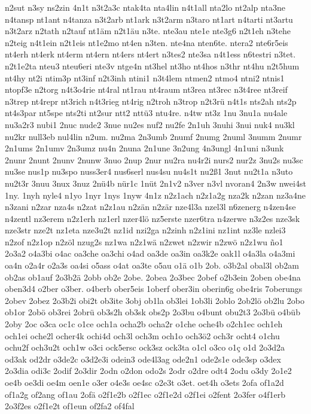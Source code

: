 {n2sut
n3sy
ns2zin
4n1t
n3t2a3c
ntak4ta
nta4lin
n4t1all
nta2lo
nt2alp
nta3ne
n4tansp
nt1ant
n4tanza
n3t2arb
nt1ark
n3t2arm
n3taro
nt1art
n4tarti
nt3artu
n3t2arz
n2tath
n2tauf
nt1äm
n2t1äu
n3te.
nte3au
nte1e
nte3g6
n2t1eh
n3tehe
n2teig
n4t1ein
n2t1eis
nt1e2mo
nt4en
n3ten.
nte4na
nten6te.
ntera2
nte6r5eis
nt4erh
nt4erk
nt4erm
nt4ern
nt4ers
nt4ert
n3tes2
nte3sa
n4t1ess
n6testri
n3tet.
n2t1e2ta
nteu3
nteu6eri
nte3v
ntge4n
nt3hel
nt3ho
nt4hos
n3thr
nt4hu
n2t5hum
nt4hy
nt2i
ntim3p
nt3inf
n2t3inh
ntini1
n3t4lem
ntmen2
ntmo4
ntni2
ntnis1
ntopf3e
n2torg
n4t3o4rie
nt4ral
nt1rau
nt4raum
nt3rea
nt3rec
n3t4ree
nt3reif
n3trep
nt4repr
nt3rich
n4t3rieg
nt4rig
n2troh
n3trop
n2t3rü
n4t1s
nts2ah
nts2p
nt4s3par
nt5spe
nts2ti
nt2sur
ntt2
nttü3
ntu4re.
n4tw
nt3z
1nu
3nu1a
nu4ale
nu3a2r3
nubi1
2nuc
nude2
3nue
nu2es
nuf2
nu2fe
2n1uh
3nuhi
3nui
nuk4
nu3kl
nu2kr
null3eb
nul4lin
n2um.
nu2ma
2n3umb
2numf
2numg
2numl
3numm
2numr
2n1ums
2n1umv
2n3umz
nu4n
2nuna
2n1une
3n2ung
4n3ungl
4n1uni
n3unk
2nunr
2nunt
2nunv
2nunw
3nuo
2nup
2nur
nu2ra
nu4r2i
nurs2
nur2z
3nu2s
nu3sc
nu3se
nus1p
nu3spo
nuss3er4
nus6serl
nus4su
nu4s1t
nu2ß1
3nut
nu2t1a
n3uto
nu2t3r
3nuu
3nux
3nuz
2nü4b
nür1c
1nüt
2n1v2
n3ver
n3vl
nvoran4
2n3w
nwei4st
1ny.
1nyh
nyle4
n1yo
1nyr
1nys
1nyw
4n1z
n2z1ach
n2z1a2g
nza2k
n2zan
nz3a4ne
n3zani
n2zar
nza4s
n2zat
n2z1au
n2zän
n2zär
nze4l3a
nzel3l
n6zenerg
n4zen4se
n4zentl
nz3erem
n2z1erh
nz1erl
nzer4lö
nz5erste
nzer6tra
n4zerwe
n3z2es
nze3sk
nze3str
nze2t
nz1eta
nze3u2t
nz1id
nzi2ga
n2zinh
n2z1ini
nz1int
nz3le
nzlei3
n2zof
n2z1op
n2zöl
nzug2s
nz1wa
n2z1wä
n2zwet
n2zwir
n2zwö
n2z1wu
ño1
2o3a2
o4a3bi
o4ac
oa3che
oa3chi
o4ad
oa3de
oa3in
oa3k2e
oak1l
o4a3la
o4a3mi
oa4n
o2a4r
o2a3s
oa4si
o5ass
o4at
oa3te
o5au
o1ä
o1b
2ob.
o3b2al
obal3l
ob2am
ob2as
ob1auf
2o3b2ä
2obb
ob2e
2obe.
2obea
2o3bec
2obef
o2b3ein
2oben
obe4na
oben3d4
o2ber
o3ber.
o4berb
ober5eis
1oberf
ober3in
oberin6g
obe4ris
7oberungs
2obev
2obez
2o3b2i
obi2t
ob3ite
3obj
ob1la
ob3lei
1ob3li
2oblo
2ob2lö
ob2lu
2obo
ob1or
2obö
ob3rei
2obrü
ob3s2h
ob3sk
obs2p
2o3bu
o4bunt
obu2t3
2o3bü
o4büb
2oby
2oc
o3ca
oc1c
o1ce
och1a
ocha2b
ocha2r
o1che
oche4b
o2ch1ec
och1eh
och1ei
oche2l
ocher4k
ochi4d
och3l
och3m
och1o
och3ö2
och3r
ocht4
o1chu
ochu2f
och3u2t
och1w
o3ci
ock5ersc
ock3sz
ock3ta
o1cl
o3co
o1ç
o1d
2o3d2a
od3ak
od2dr
o3de2c
o3d2e3i
odein3
ode4l3ag
ode2n1
ode2s1e
ode3sp
o3dex
2o3dia
odi3c
2odif
2o3dir
2odn
o2don
odo2s
2odr
o2dre
odt4
2odu
o3dy
2o1e2
oe4b
oe3di
oe4m
oen1e
o3er
o4e3s
oe4sc
o2e3t
o3et.
oet4h
o3ets
2ofa
of1a2d
of1a2g
of2ang
of1au
2ofä
o2f1e2b
o2f1ec
o2f1e2d
o2f1ei
o2fent
2o3fer
o4f1erb
2o3f2es
o2f1e2t
of1eun
of2fa2
of4fal
}
